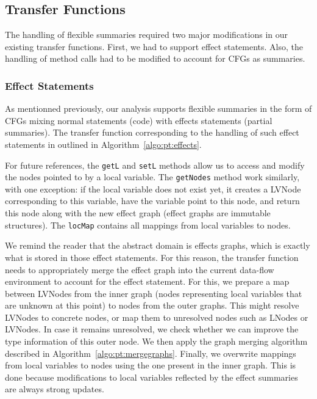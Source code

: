 \documentclass[a4paper]{article}
\begin{document}
\FloatBarrier

\subsection{Transfer Functions}
The handling of flexible summaries required two major modifications in our
existing transfer functions. First, we had to support effect statements.
Also, the handling of method calls had to be modified to account for CFGs as
summaries.

\subsubsection{Effect Statements}
As mentionned previously, our analysis supports flexible summaries in the form
of CFGs mixing normal statements (code) with effects statements (partial
summaries). The transfer function corresponding to the handling of such effect
statements in outlined in Algorithm~\ref{algo:pt:effects}.

For future references, the \verb=getL= and \verb=setL= methods allow us to
access and modify the nodes pointed to by a local variable. The \verb=getNodes=
method work similarly, with one exception: if the local variable does not exist
yet, it creates a LVNode corresponding to this variable, have the variable
point to this node, and return this node along with the new effect graph
(effect graphs are immutable structures). The \verb=locMap= contains all
mappings from local variables to nodes.

We remind the reader that the abstract domain is effects graphs, which is
exactly what is stored in those effect statements. For this reason, the
transfer function needs to appropriately merge the effect graph into the
current data-flow environment to account for the effect statement. For this,
we prepare a map between LVNodes from the inner graph (nodes representing local
variables that are unknown at this point) to nodes from the outer graphs. This
might resolve LVNodes to concrete nodes, or map them to unresolved nodes such
as LNodes or LVNodes. In case it remains unresolved, we check whether we can improve
the type information of this outer node. We then apply the graph merging
algorithm described in Algorithm~\ref{algo:pt:mergegraphs}. Finally, we
overwrite mappings from local variables to nodes using the one present in the
inner graph. This is done because modifications to local variables reflected by
the effect summaries are always strong updates.
\end{document}
